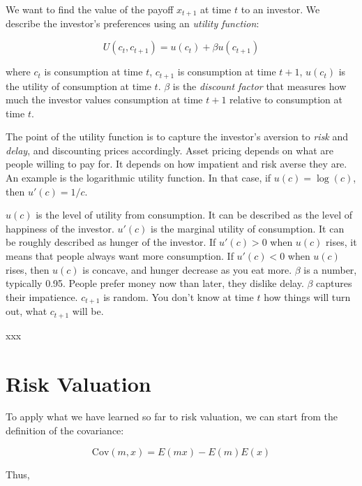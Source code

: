 We want to find the value of the payoff $x_{t+1}$ at time $t$ to an 
investor. We describe the investor's preferences using an 
\textit{utility function}:

\begin{equation}
    U(c_t, c_{t+1}) = u(c_t) + \beta u(c_{t+1})
\end{equation}

where $c_t$ is consumption at time $t$, $c_{t+1}$ is consumption at
time $t+1$, $u(c_t)$ is the utility of consumption at time $t$.
$\beta$ is the \textit{discount factor} that measures how much the
investor values consumption at time $t+1$ relative to consumption at
time $t$. 

The point of the utility function is to capture the investor's
aversion to \textit{risk} and \textit{delay}, and 
discounting prices accordingly. 
Asset pricing depends on what are people willing to pay for.
It depends on how impatient and risk averse they are.
An example is the logarithmic utility function. In that case,
if $u(c) = \log(c)$, then $u'(c) = 1/c$. 

$u(c)$ is the level of utility from consumption. It can be described 
as the level of happiness of the investor. $u'(c)$ is the 
marginal utility of consumption. It can be roughly described as 
hunger of the investor.
If $u'(c) > 0$ when $u(c)$ rises, it means that people 
always want more consumption. If $u'(c) < 0$ when $u(c)$ rises,
then $u(c)$ is concave, and hunger decrease as you eat more.
$\beta$ is a number, typically 0.95. People prefer money now 
than later, they dislike delay. $\beta$ captures their impatience.
$c_{t+1}$ is random. You don't know at time $t$ how things will 
turn out, what $c_{t+1}$ will be.

\begin{tcolorbox}[colback=white, colframe=black, title=Example X]
    xxx
\end{tcolorbox}

\section{Risk Valuation}

To apply what we have learned so far to risk valuation, we can start
from the definition of the covariance:

\begin{equation}
    \text{Cov}(m, x) = E(mx) - E(m)E(x)
\end{equation}

Thus,

